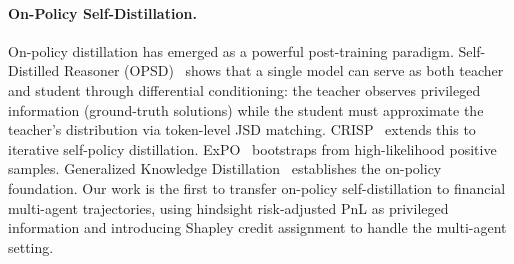 \paragraph{On-Policy Self-Distillation.}
On-policy distillation has emerged as a powerful post-training paradigm. Self-Distilled Reasoner (OPSD)~\cite{opsd2026} shows that a single model can serve as both teacher and student through differential conditioning: the teacher observes privileged information (ground-truth solutions) while the student must approximate the teacher's distribution via token-level JSD matching. CRISP~\cite{crisp2026} extends this to iterative self-policy distillation. ExPO~\cite{expo2025} bootstraps from high-likelihood positive samples. Generalized Knowledge Distillation~\cite{gkd2024} establishes the on-policy foundation. Our work is the first to transfer on-policy self-distillation to financial multi-agent trajectories, using hindsight risk-adjusted PnL as privileged information and introducing Shapley credit assignment to handle the multi-agent setting.

